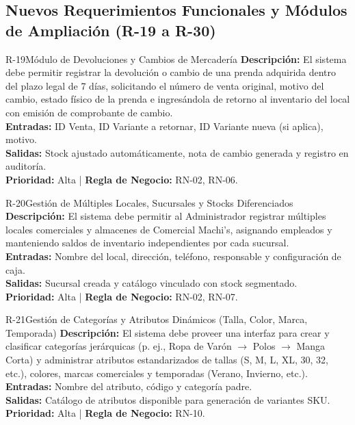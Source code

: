 \subsection{Nuevos Requerimientos Funcionales y Módulos de Ampliación (R-19 a R-30)}

\begin{reqbox}{R-19}{Módulo de Devoluciones y Cambios de Mercadería}
\textbf{Descripción:} El sistema debe permitir registrar la devolución o cambio de una prenda adquirida dentro del plazo legal de 7 días, solicitando el número de venta original, motivo del cambio, estado físico de la prenda e ingresándola de retorno al inventario del local con emisión de comprobante de cambio.\\
\textbf{Entradas:} ID Venta, ID Variante a retornar, ID Variante nueva (si aplica), motivo.\\
\textbf{Salidas:} Stock ajustado automáticamente, nota de cambio generada y registro en auditoría.\\
\textbf{Prioridad:} Alta | \textbf{Regla de Negocio:} RN-02, RN-06.
\end{reqbox}

\begin{reqbox}{R-20}{Gestión de Múltiples Locales, Sucursales y Stocks Diferenciados}
\textbf{Descripción:} El sistema debe permitir al Administrador registrar múltiples locales comerciales y almacenes de Comercial Machi's, asignando empleados y manteniendo saldos de inventario independientes por cada sucursal.\\
\textbf{Entradas:} Nombre del local, dirección, teléfono, responsable y configuración de caja.\\
\textbf{Salidas:} Sucursal creada y catálogo vinculado con stock segmentado.\\
\textbf{Prioridad:} Alta | \textbf{Regla de Negocio:} RN-02, RN-07.
\end{reqbox}

\begin{reqbox}{R-21}{Gestión de Categorías y Atributos Dinámicos (Talla, Color, Marca, Temporada)}
\textbf{Descripción:} El sistema debe proveer una interfaz para crear y clasificar categorías jerárquicas (p. ej., Ropa de Varón $\rightarrow$ Polos $\rightarrow$ Manga Corta) y administrar atributos estandarizados de tallas (S, M, L, XL, 30, 32, etc.), colores, marcas comerciales y temporadas (Verano, Invierno, etc.).\\
\textbf{Entradas:} Nombre del atributo, código y categoría padre.\\
\textbf{Salidas:} Catálogo de atributos disponible para generación de variantes SKU.\\
\textbf{Prioridad:} Alta | \textbf{Regla de Negocio:} RN-10.
\end{reqbox}

